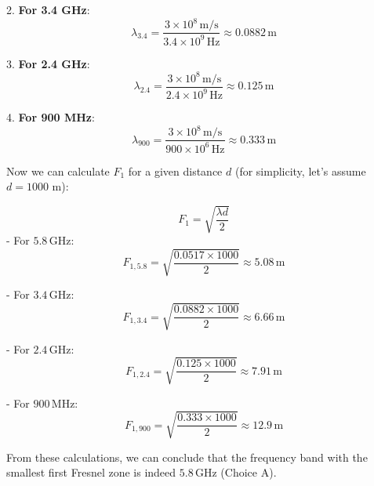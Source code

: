 2. \textbf{For 3.4 GHz}:
   \[
   \lambda_{3.4} = \frac{3 \times 10^8 \, \text{m/s}}{3.4 \times 10^9 \, \text{Hz}} \approx 0.0882 \, \text{m}
   \]

3. \textbf{For 2.4 GHz}:
   \[
   \lambda_{2.4} = \frac{3 \times 10^8 \, \text{m/s}}{2.4 \times 10^9 \, \text{Hz}} \approx 0.125 \, \text{m}
   \]

4. \textbf{For 900 MHz}:
   \[
   \lambda_{900} = \frac{3 \times 10^8 \, \text{m/s}}{900 \times 10^6 \, \text{Hz}} \approx 0.333 \, \text{m}
   \]

Now we can calculate \(F_1\) for a given distance \(d\) (for simplicity, let’s assume \(d = 1000\) m):

\[
F_1 = \sqrt{\frac{\lambda d}{2}}
\]
- For \(5.8 \, \text{GHz}\):
\[
F_{1, 5.8} = \sqrt{\frac{0.0517 \times 1000}{2}} \approx 5.08 \, \text{m}
\]
  
- For \(3.4 \, \text{GHz}\):
\[
F_{1, 3.4} = \sqrt{\frac{0.0882 \times 1000}{2}} \approx 6.66 \, \text{m}
\]

- For \(2.4 \, \text{GHz}\):
\[
F_{1, 2.4} = \sqrt{\frac{0.125 \times 1000}{2}} \approx 7.91 \, \text{m}
\]

- For \(900 \, \text{MHz}\):
\[
F_{1, 900} = \sqrt{\frac{0.333 \times 1000}{2}} \approx 12.9 \, \text{m}
\]

From these calculations, we can conclude that the frequency band with the smallest first Fresnel zone is indeed \(5.8 \, \text{GHz}\) (Choice A).



